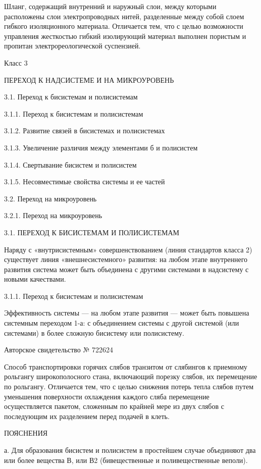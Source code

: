 Шланг,  содержащий   внутренний  и   наружный  слои,   между  которыми
расположены  слои  электропроводных  нитей,  разделенные  между  собой
слоем  гибкого изоляционного  материала. Отличается  тем, что  с целью
возможности управления жесткостью гибкий изолирующий материал выполнен
пористым и пропитан электрореологической суспензией.


Класс 3

ПЕРЕХОД К НАДСИСТЕМЕ И НА МИКРОУРОВЕНЬ

3.1. Переход к бисистемам и полисистемам

3.1.1. Переход к бисистемам и полисистемам

3.1.2. Развитие связей в бисистемах и полисистемах

3.1.3. Увеличение различия между элементами б и полисистем

3.1.4. Свертывание бисистем и полисистем

3.1.5. Несовместимые свойства системы и ее частей

3.2. Переход на микроуровень

3.2.1. Переход на микроуровень


3.1. ПЕРЕХОД К БИСИСТЕМАМ И ПОЛИСИСТЕМАМ

Наряду с «внутрисистемным» совершенствованием (линия стандартов класса
2)  существует  линия  «внешнесистемного»  развития:  на  любом  этапе
внутреннего развития система может быть объединена с другими системами
в надсистему с новыми качествами.

3.1.1. Переход к бисистемам и полисистемам

Эффективность системы — на любом  этапе развития — может быть повышена
системным переходом 1-а: с объединением системы с другой системой (или
системами) в более сложную бисистему или полисистему.


Авторское свидетельство № 722624

Способ  транспортировки  горячих  слябов   транзитом  от  слябингов  к
приемному рольгангу широкополосного  стана, включающий порезку слябов,
их  перемещение по  рольгангу. Отличается  тем, что  с целью  снижения
потерь тепла  слябов путем  уменьшения поверхности  охлаждения каждого
сляба перемещение осуществляется пакетом, сложенным по крайней мере из
двух слябов с последующим их разделением перед подачей в клеть.


ПОЯСНЕНИЯ

а.  Для   образования  бисистем  и  полисистем   в  простейшем  случае
объединяют  два  или  более  вещества  В,  или  В2  (бивещественные  и
поливещественные веполи).

